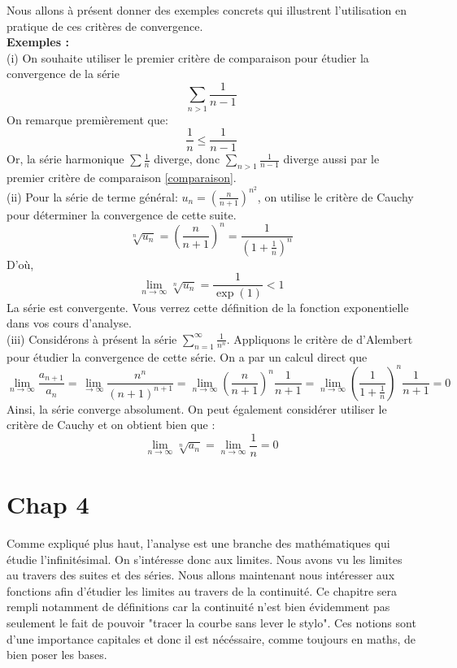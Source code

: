 \documentclass[a4paper, 12pt, french, twoside]{article}
\begin{document}
Nous allons à présent donner des exemples concrets qui illustrent l'utilisation en pratique de ces critères de convergence. \\
\textbf{Exemples :}
\\ (i) On souhaite utiliser le premier critère de comparaison pour étudier la convergence de la série 
\begin{equation*}
    \sum_{n> 1} \frac{1}{n-1}
\end{equation*}
On remarque premièrement que: 
\begin{equation*}
    \frac{1}{n}\leq \frac{1}{n-1}
\end{equation*}
Or, la série harmonique $\sum\frac{1}{n}$ diverge, donc $\underset{n> 1}{\sum}\frac{1}{n-1}$ diverge aussi par le premier critère de comparaison \ref{comparaison}. \\
(ii) Pour la série de terme général: $u_n=\left(\frac{n}{n+1}\right)^{n^2}$, on utilise le critère de Cauchy pour déterminer la convergence de cette suite.
\begin{equation*}
    \sqrt[n]{u_n}=\left( \frac{n}{n+1} \right)^n=\frac{1}{\left(1+\frac{1}{n}\right)^n} 
\end{equation*}
D'où, $$\lim_{n\rightarrow\infty} \sqrt[n]{u_n}=\frac{1}{\exp(1)}<1$$
La série est convergente. Vous verrez cette définition de la fonction exponentielle dans vos cours d'analyse.
\\
(iii) Considérons à présent la série $ \sum_{n=1}^{\infty} \frac{1}{n^n}$.
Appliquons le critère de d'Alembert pour étudier la convergence de cette série. 
On a par un calcul direct  que  $$ \lim_{n\to \infty} \frac{a_{n+1}}{a_n} =\lim_{\to \infty} \frac{n^n}{(n+1)^{n+1}} = \lim_{ n \to \infty}\left ( \frac{n}{n+1} \right )^n \frac{1}{n+1} = \lim_{ n \to \infty} \left ( \frac{1}{1 + \frac{1}{n}} \right )^n \frac{1}{n+1} = 0  $$
Ainsi, la série converge absolument. 
On peut également considérer utiliser le critère de Cauchy et on obtient bien que : 
$$\lim_{n\to \infty} \sqrt[n]{a_n} = \lim_{n\to \infty} \frac{1}{n} = 0 $$



\newpage
\section{Chap 4}
Comme expliqué plus haut, l'analyse est une branche des mathématiques qui étudie l'infinitésimal. On s'intéresse donc aux limites. Nous avons vu les limites au travers des suites et des séries. Nous allons maintenant nous intéresser aux fonctions afin d'étudier les limites au travers de la continuité. Ce chapitre sera rempli notamment de définitions car la continuité n'est bien évidemment pas seulement le fait de pouvoir "tracer la courbe sans lever le stylo". Ces notions sont d'une importance capitales et donc il est nécéssaire, comme toujours en maths, de bien poser les bases.
\end{document}
